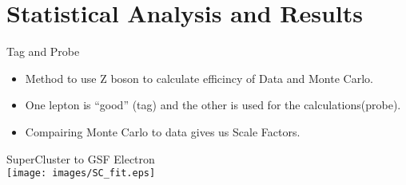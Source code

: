 \section{Statistical Analysis and Results}


\begin{frame}{Tag and Probe}
\begin {itemize}
  \item
    Method to use Z boson to calculate efficincy of Data and Monte Carlo.
  \item
    One lepton is ``good'' (tag) and the other is used for the calculations(probe).
  \item
    Compairing Monte Carlo to data gives us Scale Factors.
\end{itemize}
\begin{center}
SuperCluster to GSF Electron\\
\texttt{[image: images/SC\_fit.eps]}
\end{center}
\end{frame}


